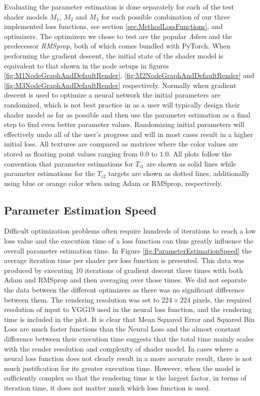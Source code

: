 Evaluating the parameter estimation is done separately for each of the test shader models $M_1$, $M_2$ and $M_3$ for each possible combination of our three implemented loss functions, see section \ref{sec:MethodLossFunctions}, and optimizers. The optimizers we chose to test are the popular \textit{Adam} and the predecessor \textit{RMSprop}, both of which comes bundled with PyTorch. When performing the gradient descent, the initial state of the shader model is equivalent to that shown in the node setups in figures \ref{fig:M1NodeGraphAndDefaultRender}, \ref{fig:M2NodeGraphAndDefaultRender} and \ref{fig:M3NodeGraphAndDefaultRender} respectively. Normally when gradient descent is used to optimize a neural network the initial parameters are randomized, which is not best practice in \dipter{} as a user will typically design their shader model as far as possible and then use the parameter estimation as a final step to find even better parameter values. Randomizing initial parameters will effectively undo all of the user's progress and will in most cases result in a higher initial loss. All textures are compared as matrices where the color values are stored as floating point values ranging from $0.0$ to $1.0$. All plots follow the convention that parameter estimations for $T_{i1}$ are shown as solid lines while parameter estimations for the $T_{i2}$ targets are shown as dotted lines, additionally using blue or orange color when using Adam or RMSprop, respectively.

\subsection{Parameter Estimation Speed}\label{sec:EvalParameterEstimationSpeed}

Difficult optimization problems often require hundreds of iterations to reach a low loss value and the execution time of a loss function can thus greatly influence the overall parameter estimation time. In Figure \ref{fig:ParameterEstimationSpeed} the average iteration time per shader per loss function is presented. This data was produced by executing 10 iterations of gradient descent three times with both Adam and RMSprop and then averaging over those times. We did not separate the data between the different optimizers as there was no significant difference between them. The rendering resolution was set to $224\times224$ pixels, the required resolution of input to VGG19 used in the neural loss function, and the rendering time is included in the plot. It is clear that Mean Squared Error and Squared Bin Loss are much faster functions than the Neural Loss and the almost constant difference between their execution time suggests that the total time mainly scales with the render resolution and complexity of shader model. In cases where a neural loss function does not clearly result in a more accurate result, there is not much justification for its greater execution time. However, when the model is sufficiently complex so that the rendering time is the largest factor, in terms of iteration time, it does not matter much which loss function is used. 


